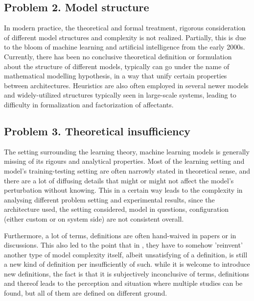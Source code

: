 \documentclass[10pt]{article}
\begin{document}
\subsection*{Problem 2. Model structure}

In modern practice, the theoretical and formal treatment, rigorous consideration of different model structures and complexity is not realized. Partially, this is due to the bloom of machine learning and artificial intelligence from the early 2000s. Currently, there has been no conclusive theoretical definition or formulation about the structure of different models, typically can go under the name of mathematical modelling hypothesis, in a way that unify certain properties between architectures. Heuristics are also often employed in several newer models and widely-utilized structures typically seen in large-scale systems, leading to difficulty in formalization and factorization of affectants. 

\subsection*{Problem 3. Theoretical insufficiency}

The setting surrounding the learning theory, machine learning models is generally missing of its rigours and analytical properties. Most of the learning setting and model's training-testing setting are often narrowly stated in theoretical sense, and there are a lot of diffusing details that might or might not affect the model's perturbation without knowing. This in a certain way leads to the complexity in analysing different problem setting and experimental results, since the architecture used, the setting considered, model in questions, configuration (either custom or on system side) are not consistent overall. 

Furthermore, a lot of terms, definitions are often hand-waived in papers or in discussions. This also led to the point that in \cite{nakkiran_deep_2019}, they have to somehow 'reinvent' another type of model complexity itself, albeit unsatisfying of a definition, is still a new kind of definition per insufficiently of such. while it is welcome to introduce new definitions, the fact is that it is subjectively inconclusive of terms, definitions and thereof leads to the perception and situation where multiple studies can be found, but all of them are defined on different ground.
\end{document}
